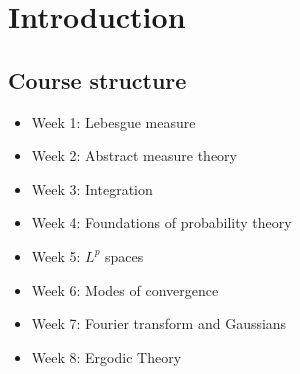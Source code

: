 \documentclass{article}
\newcommand{\1}[1]{\mathbbm{1}_{#1}}
\begin{document}
\maketitle
\tableofcontents
\clearpage
\section{Introduction}
\subsection{Course structure}
\begin{itemize}
    \item Week 1: Lebesgue measure
    \item Week 2: Abstract measure theory
    \item Week 3: Integration
    \item Week 4: Foundations of probability theory
    \item Week 5: $L^p$ spaces
    \item Week 6: Modes of convergence
    \item Week 7: Fourier transform and Gaussians
    \item Week 8: Ergodic Theory
\end{itemize}
\end{document}
